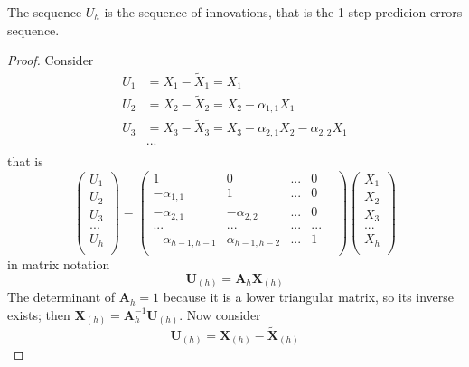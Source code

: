 \begin{remark}
    The sequence $U_h$ is the sequence of innovations, that is the 1-step predicion errors sequence.
\end{remark}

\begin{proof}
    Consider
    \begin{equation*}
        \begin{split}
            U_1&=X_1-\tilde{X}_1=X_1\\
            U_2&=X_2-\tilde{X}_2=X_2-\alpha_{1,1}X_1\\
            U_3&=X_3-\tilde{X}_3=X_3-\alpha_{2,1}X_2-\alpha_{2,2}X_1\\
            &...\\
        \end{split}
    \end{equation*}
    that is
    \[
        \begin{pmatrix}
            U_1\\
            U_2\\
            U_3\\
            ...\\
            U_h\\
        \end{pmatrix}  
        =
        \begin{pmatrix}
            1&0&...&0\\
            -\alpha_{1,1}&1&...&0\\
            -\alpha_{2,1}&-\alpha_{2,2}&...&0\\
            ...&...&...&...&\\
            -\alpha_{h-1,h-1}&\alpha_{h-1,h-2}&...&1\\
        \end{pmatrix}
        \begin{pmatrix}
            X_1\\
            X_2\\
            X_3\\
            ...\\
            X_h\\
        \end{pmatrix}
    \]
    in matrix notation
    \[
        \boldsymbol{U}_{(h)}=\boldsymbol{A}_h\boldsymbol{X}_{(h)}  
    \]
    The determinant of $\boldsymbol{A}_h=1$ because it is a lower triangular matrix, so its inverse exists; then $\boldsymbol{X}_{(h)}=\boldsymbol{A}_h^{-1}\boldsymbol{U}_{(h)}$. Now consider
    \[
        \boldsymbol{U}_{(h)}=\boldsymbol{X}_{(h)}-\tilde{\boldsymbol{X}}_{(h)}
\]
\end{proof}
